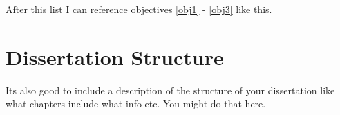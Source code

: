 After this list I can reference objectives \ref{obj1} - \ref{obj3} like this.

\section{Dissertation Structure}

Its also good to include a description of the structure of your dissertation
like what chapters include what info etc. You might do that here.

\singlespacing


\doublespacing
